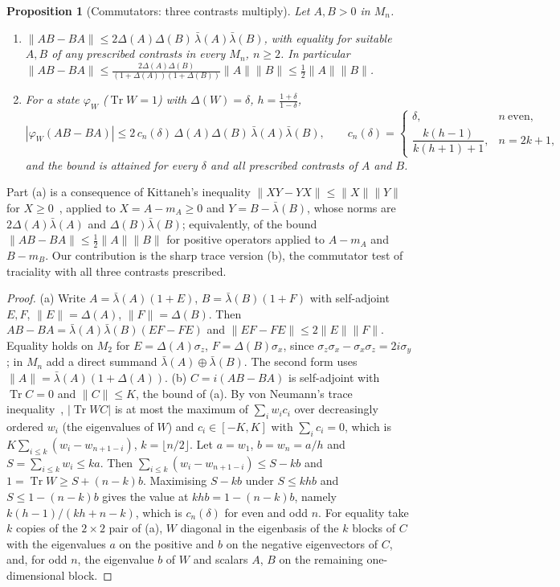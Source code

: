 \documentclass[11pt]{article}
\DeclareMathOperator{\Tr}{Tr}
\theoremstyle{plain}
\newtheorem{proposition}[theorem]{Proposition}
\theoremstyle{definition}
\theoremstyle{remark}
\begin{document}
\begin{proposition}[Commutators: three contrasts multiply]\label{prop:commutator}
Let $A,B>0$ in $M_n$.
\begin{enumerate}
\item[(a)] $\|AB-BA\|\le2\Delta(A)\Delta(B)\,\bar\lambda(A)\bar\lambda(B)$, with equality for suitable $A,B$ of any prescribed contrasts in
every $M_n$, $n\ge2$. In particular $\|AB-BA\|\le\frac{2\Delta(A)\Delta(B)}{(1+\Delta(A))(1+\Delta(B))}\|A\|\|B\|\le
\frac12\|A\|\|B\|$.
\item[(b)] For a state $\varphi_W$ ($\Tr W=1$) with $\Delta(W)=\delta$, $h=\frac{1+\delta}{1-\delta}$,
\[
  |\varphi_W(AB-BA)|\le2\,c_n(\delta)\,\Delta(A)\Delta(B)\,\bar\lambda(A)\bar\lambda(B),\qquad
  c_n(\delta)=\begin{cases}\delta,&n\ \text{even},\\[2pt] \dfrac{k(h-1)}{k(h+1)+1},&n=2k+1,\end{cases}
\]
and the bound is attained for every $\delta$ and all prescribed contrasts of $A$ and $B$.
\end{enumerate}
\end{proposition}
\noindent Part (a) is a consequence of Kittaneh's inequality $\|XY-YX\|\le\|X\|\|Y\|$ for $X\ge0$~\cite{kittaneh2008},
applied to $X=A-m_A\ge0$ and $Y=B-\bar\lambda(B)$, whose norms are $2\Delta(A)\bar\lambda(A)$ and $\Delta(B)\bar\lambda(B)$;
equivalently, of the bound $\|AB-BA\|\le\frac12\|A\|\|B\|$ for positive operators applied to $A-m_A$ and $B-m_B$. Our
contribution is the sharp trace version (b), the commutator test of traciality with all three contrasts prescribed.

\begin{proof}
(a) Write $A=\bar\lambda(A)(1+E)$, $B=\bar\lambda(B)(1+F)$ with self-adjoint $E,F$, $\|E\|=\Delta(A)$, $\|F\|=\Delta(B)$.
Then $AB-BA=\bar\lambda(A)\bar\lambda(B)(EF-FE)$ and $\|EF-FE\|\le2\|E\|\|F\|$. Equality holds on $M_2$ for $E=\Delta(A)\sigma_z$,
$F=\Delta(B)\sigma_x$, since $\sigma_z\sigma_x-\sigma_x\sigma_z=2i\sigma_y$; in $M_n$ add a direct summand $\bar\lambda(A)\oplus\bar\lambda(B)$.
The second form uses $\|A\|=\bar\lambda(A)(1+\Delta(A))$. (b) $C=i(AB-BA)$ is self-adjoint with $\Tr C=0$ and $\|C\|\le K$, the bound
of (a). By von Neumann's trace inequality~\cite{bhatia1997}, $|\Tr WC|$ is at most the maximum of
$\sum_iw_ic_i$ over decreasingly ordered $w_i$ (the eigenvalues of $W$) and $c_i\in[-K,K]$ with $\sum_ic_i=0$, which is
$K\sum_{i\le k}(w_i-w_{n+1-i})$, $k=\lfloor n/2\rfloor$. Let $a=w_1$, $b=w_n=a/h$ and $S=\sum_{i\le k}w_i\le ka$. Then
$\sum_{i\le k}(w_i-w_{n+1-i})\le S-kb$ and $1=\Tr W\ge S+(n-k)b$. Maximising $S-kb$ under $S\le khb$ and $S\le1-(n-k)b$ gives
the value at $khb=1-(n-k)b$, namely $k(h-1)/(kh+n-k)$, which is $c_n(\delta)$ for even and odd $n$. For equality take $k$
copies of the $2\times2$ pair of (a), $W$ diagonal in the eigenbasis of the $k$ blocks of $C$ with the eigenvalues $a$ on the
positive and $b$ on the negative eigenvectors of $C$, and, for odd $n$, the eigenvalue $b$ of $W$ and scalars $A$, $B$ on
the remaining one-dimensional block.
\end{proof}
\end{document}
